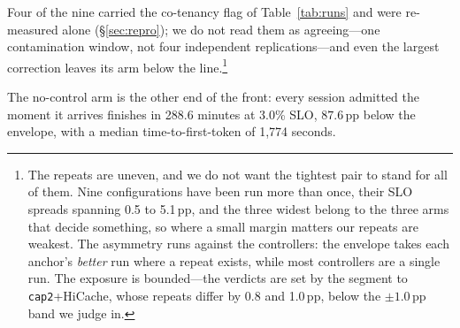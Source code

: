Four of the nine carried the co-tenancy flag of Table~\ref{tab:runs} and were
re-measured alone (\S\ref{sec:repro}); we do not read them as
agreeing---one contamination window, not four independent replications---and even
the largest correction leaves its arm below the line.\footnote{The repeats are uneven, and we do not want the tightest pair to stand
for all of them. Nine configurations have been run more than once, their SLO
spreads spanning 0.5 to 5.1\,pp, and the three widest belong to the three arms
that decide something, so where a small margin matters our repeats are weakest.
The asymmetry runs against the controllers: the envelope takes each anchor's
\emph{better} run where a repeat exists, while most controllers are a single run.
The exposure is bounded---the verdicts are set by the segment to
\texttt{cap2}+HiCache, whose repeats differ by 0.8 and 1.0\,pp, below the
$\pm1.0$\,pp band we judge in.}

The no-control arm is the other end of the front:
every session admitted the moment it arrives finishes in 288.6 minutes at 3.0\%
SLO, $87.6$\,pp below the envelope, with a median time-to-first-token of
1{,}774 seconds.

